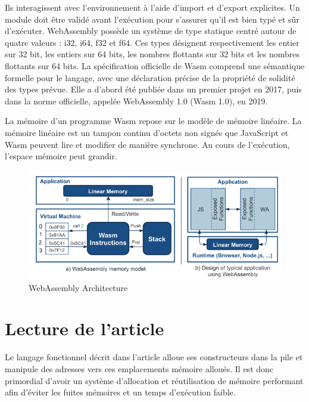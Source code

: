 \documentclass{rapportECL}
\begin{document}
Ils interagissent avec l’environnement à l’aide d’import et d’export explicites. 
Un module doit être validé avant l’exécution pour s’assurer qu’il est bien typé et sûr d’exécuter. 
WebAssembly possède un système de type statique centré autour de quatre valeurs :  i32, i64, f32 et f64. 
Ces types désignent respectivement les entier sur 32 bit, les entiers sur 64 bits, les nombres flottants sur 32 bits et les nombres 
flottants sur 64 bits.
La spécification officielle de Wasm comprend une sémantique formelle pour le langage, 
avec une déclaration précise de la propriété de solidité des types prévue. 
Elle a d'abord été publiée dans un premier projet en 2017, puis dans la norme officielle, appelée WebAssembly 1.0 (Wasm 1.0), en 2019.
\par La mémoire d’un programme Wasm repose sur le modèle de mémoire linéaire\cite{haas_bringing_2017}. 
La mémoire linéaire est un tampon continu d'octets non signés  que JavaScript et Wasm peuvent lire et modifier de manière synchrone. 
Au cours de l’exécution, l’espace mémoire peut grandir. 

\begin{figure}[ht]
	\centering
	\includegraphics[scale=0.55]{logos/model_memory_wasm.png}	
	\caption{WebAssembly Architecture \cite{noauthor_wasmati_nodate}}
\end{figure}
\FloatBarrier 



\section{Lecture de l'article} \label{section:article}
Le langage fonctionnel décrit dans l'article\cite{ullrich_counting_2020} alloue ses constructeurs dans la pile et manipule des 
adresses vers ces emplacements mémoire alloués. Il est donc primordial d'avoir un système d'allocation et réutilisation de 
mémoire performant afin d'éviter les fuites mémoires et un temps d'exécution faible.
\end{document}
